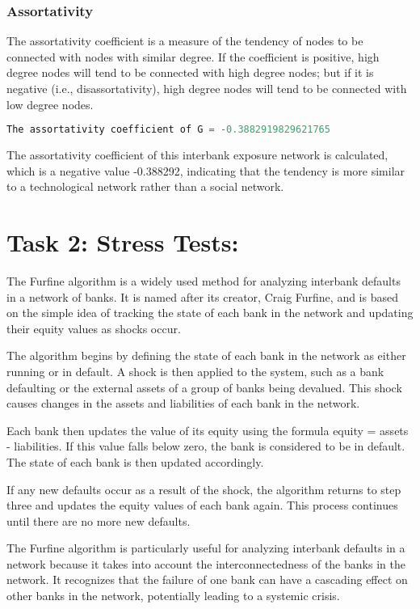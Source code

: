 \subsubsection{Assortativity}
The assortativity coefficient is a measure of the tendency of nodes to be connected with nodes with similar degree. If the coefficient is positive, high degree nodes will tend to be connected with high degree nodes; but if it is negative (i.e., disassortativity), high degree nodes will tend to be connected with low degree nodes.

\begin{lstlisting}[language=python]
    The assortativity coefficient of G = -0.3882919829621765
\end{lstlisting}

The assortativity coefficient of this interbank exposure network is calculated, which is a negative value -0.388292, indicating that the tendency is more similar to a technological network rather than a social network.

\section{Task 2: Stress Tests:}
The Furfine algorithm\cite{furfine1999pricing} is a widely used method for analyzing interbank defaults in a network of banks. It is named after its creator, Craig Furfine, and is based on the simple idea of tracking the state of each bank in the network and updating their equity values as shocks occur.

The algorithm begins by defining the state of each bank in the network as either running or in default. A shock is then applied to the system, such as a bank defaulting or the external assets of a group of banks being devalued. This shock causes changes in the assets and liabilities of each bank in the network.

Each bank then updates the value of its equity using the formula equity = assets - liabilities. If this value falls below zero, the bank is considered to be in default. The state of each bank is then updated accordingly.

If any new defaults occur as a result of the shock, the algorithm returns to step three and updates the equity values of each bank again. This process continues until there are no more new defaults.

The Furfine algorithm is particularly useful for analyzing interbank defaults in a network because it takes into account the interconnectedness of the banks in the network. It recognizes that the failure of one bank can have a cascading effect on other banks in the network, potentially leading to a systemic crisis.

